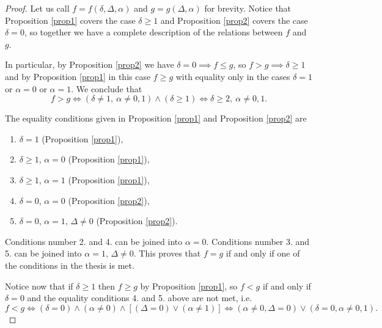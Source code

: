 \documentclass[a4paper,10pt]{article}
\theoremstyle{definition}
\theoremstyle{plain}
\begin{document}
\begin{proof}
  Let us call $f=f(\delta,\Delta,\alpha)$ and $g= g(\Delta,\alpha)$ for brevity.  Notice that Proposition \ref{prop1} covers the case $\delta\ge 1$ and Proposition \ref{prop2} covers the case $\delta=0$, so together we have a complete description of the relations between $f$ and $g$. 

  In particular, by Proposition \ref{prop2} we have $\delta = 0 \implies f\le g$, so  $ f> g \implies \delta\ge 1$ and 
   by Proposition \ref{prop1}  in this case $f\ge g$ with equality only in the cases $\delta=1$ or $\alpha =0$ or $\alpha = 1$. 
   We conclude that 
$$     f>g\iff 
(\delta\ne 1,\ \alpha \ne 0,1 )
    \wedge (\delta\ge 1)\iff \delta \ge 2,\ \alpha \ne 0,1 .$$
    
The equality conditions given in Proposition \ref{prop1} and Proposition \ref{prop2} are 
\begin{enumerate}
    \item $\delta = 1$ (Proposition \ref{prop1}),
    \item $\delta \ge 1$, $\alpha = 0$ (Proposition \ref{prop1}),
    \item $\delta \ge 1$, $\alpha = 1$ (Proposition \ref{prop1}),
    \item $\delta =0$, $\alpha = 0$ (Proposition \ref{prop2}),
    \item $\delta =0$, $\alpha = 1$, $\Delta \ne 0$ (Proposition \ref{prop2}).
\end{enumerate}
Conditions number 2. and 4. can be joined into  $\alpha=0$. 
Conditions number 3. and 5. can be joined into $\alpha=1$, $\Delta \ne 0$. 
This proves that $f=g$ if and only if one of the conditions in the thesis is met. 

Notice now that if $\delta\ge 1$ then $f\ge g$ by Proposition \ref{prop1}, so $f<g$ if and only if $\delta=0$ and the equality conditions 4. and 5. above are not met, i.e.
$$     f<g\iff 
 (\delta=0) \wedge
(\alpha \ne 0 )\wedge 
[(\Delta = 0) \vee (\alpha \ne 1)] 
   \iff 
    (\alpha \ne 0, \Delta =0 )\vee (\delta= 0, \alpha \ne 0, 1 ).$$
\end{proof}
\end{document}
